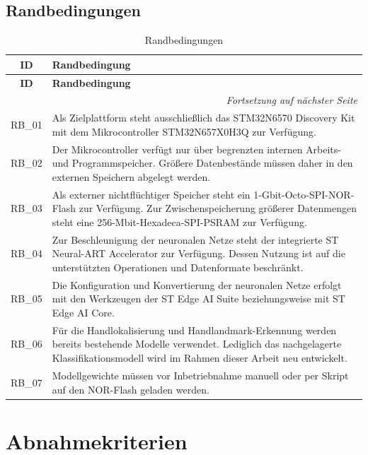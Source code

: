 \subsection{Randbedingungen}

\begin{longtable}{|c|p{}|}
    \caption{Randbedingungen}
    \label{tab:randbedingungen} \\
    \hline
    \textbf{ID} & \textbf{Randbedingung} \\
    \hline
    \endfirsthead
    \hline
    \textbf{ID} & \textbf{Randbedingung} \\
    \hline
    \endhead
    \hline
    \multicolumn{2}{r}{\textit{Fortsetzung auf nächster Seite}} \\
    \endfoot
    \hline
    \endlastfoot
    RB\_01 & Als Zielplattform steht ausschließlich das STM32N6570 Discovery Kit mit dem Mikrocontroller STM32N657X0H3Q zur Verfügung. \\
    \hline
    RB\_02 & Der Mikrocontroller verfügt nur über begrenzten internen Arbeits- und Programmspeicher. Größere Datenbestände müssen daher in den externen Speichern abgelegt werden. \\
    \hline
    RB\_03 & Als externer nichtflüchtiger Speicher steht ein 1-Gbit-Octo-SPI-NOR-Flash zur Verfügung. Zur Zwischenspeicherung größerer Datenmengen steht eine 256-Mbit-Hexadeca-SPI-PSRAM zur Verfügung. \\
    \hline
    RB\_04 & Zur Beschleunigung der neuronalen Netze steht der integrierte ST Neural-ART Accelerator zur Verfügung. Dessen Nutzung ist auf die unterstützten Operationen und Datenformate beschränkt. \\
    \hline
    RB\_05 & Die Konfiguration und Konvertierung der neuronalen Netze erfolgt mit den Werkzeugen der ST Edge AI Suite beziehungsweise mit ST Edge AI Core. \\
    \hline
    RB\_06 & Für die Handlokalisierung und Handlandmark-Erkennung werden bereits bestehende Modelle verwendet. Lediglich das nachgelagerte Klassifikationsmodell wird im Rahmen dieser Arbeit neu entwickelt. \\
    \hline
    RB\_07 & Modellgewichte müssen vor Inbetriebnahme manuell oder per Skript auf den NOR-Flash geladen werden. \\
    \hline
\end{longtable}

\section{Abnahmekriterien}

